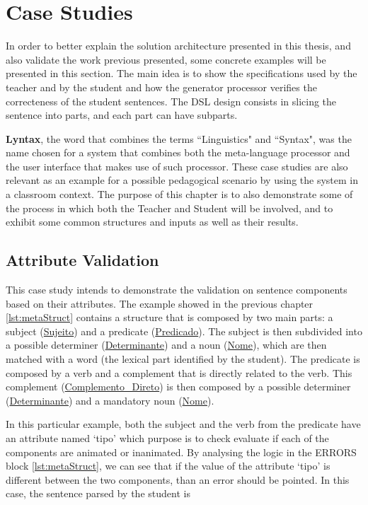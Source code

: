 \chapter{Case Studies} \label{case_study}
In order to better explain the solution architecture presented in this thesis, and also validate the work previous presented, 
some concrete examples will be presented in this section. 
The main idea is to show the specifications used by the teacher and by the student and how the generator processor verifies the correcteness of the student sentences. 
The DSL design consists in slicing the sentence into parts, and each part can have subparts.

\textbf{Lyntax}, the word that combines the terms ``Linguistics" and ``Syntax", was the name chosen for a system that combines both the meta-language processor and
the user interface that makes use of such processor.
These case studies are also relevant as an example for a possible pedagogical scenario by using the system in a classroom context.
The purpose of this chapter is to also demonstrate some of the process in which both the Teacher and Student will be involved, and to exhibit some common structures
and inputs as well as their results.

\section{Attribute Validation}
This case study intends to demonstrate the validation on sentence components based on their attributes. The example showed in the previous chapter 
\autoref{lst:metaStruct} contains a structure that is composed by two main parts: a subject (\underline{Sujeito}) and a predicate (\underline{Predicado}). 
The subject is then subdivided into a possible determiner (\underline{Determinante}) and a noun (\underline{Nome}), which are then matched with a word 
(the lexical part identified by the student). The predicate is composed by a verb and a complement that is directly related to the verb. This complement 
(\underline{Complemento\_Direto}) is then composed by a possible determiner (\underline{Determinante}) and a mandatory noun (\underline{Nome}).

In this particular example, both the subject and the verb from the predicate have an attribute named ‘tipo’ which purpose is to check evaluate if each of the components
are animated or inanimated. By analysing the logic in the ERRORS block \autoref{lst:metaStruct}, we can see that if the value of the attribute ‘tipo’ is different 
between the two components, than an error should be pointed. In this case, the sentence parsed by the student is

